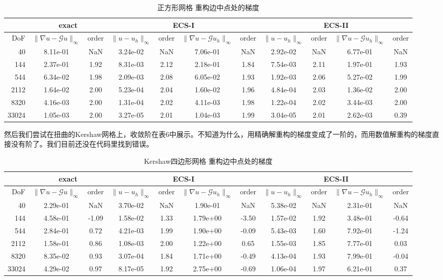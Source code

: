 \documentclass[12pt,a4paper]{article}
\theoremstyle{plain}
\begin{document}
\begin{table}[h]
\centering
\scriptsize
\begin{tabular}{r|cc|cc|cc|cc|cc}
\hline
& \multicolumn{2}{c|}{exact} & \multicolumn{4}{c}{ECS-I} & \multicolumn{4}{|c}{ECS-II} \\
\hline
DoF & $\|\nabla u - \mathcal{G} u\|_\infty$ & order & $\|u - u_h\|_\infty$ & order & $\|\nabla u - \mathcal{G} u_h\|_\infty$ & order & $\|u - u_h\|_\infty$ & order & $\|\nabla u - \mathcal{G} u_h\|_\infty$ & order \\
\hline
40 & 8.11e-01 & NaN & 3.24e-02 & NaN & 7.06e-01 & NaN & 2.92e-02 & NaN & 6.77e-01 & NaN \\
144 & 2.37e-01 & 1.92 & 8.31e-03 & 2.12 & 2.18e-01 & 1.84 & 7.54e-03 & 2.11 & 1.97e-01 & 1.93 \\
544 & 6.34e-02 & 1.98 & 2.09e-03 & 2.08 & 6.05e-02 & 1.93 & 1.92e-03 & 2.06 & 5.27e-02 & 1.99 \\
2112 & 1.64e-02 & 2.00 & 5.23e-04 & 2.04 & 1.60e-02 & 1.96 & 4.84e-04 & 2.03 & 1.36e-02 & 2.00 \\
8320 & 4.16e-03 & 2.00 & 1.31e-04 & 2.02 & 4.11e-03 & 1.98 & 1.22e-04 & 2.02 & 3.44e-03 & 2.00 \\
33024 & 1.05e-03 & 2.00 & 3.27e-05 & 2.01 & 1.04e-03 & 1.99 & 3.04e-05 & 2.01 & 2.62e-03 & 0.39 \\
\hline
\end{tabular}
\caption{正方形网格 重构边中点处的梯度}
\end{table}

然后我们尝试在扭曲的Kershaw网格上，收敛阶在表6中展示。不知道为什么，用精确解重构的梯度变成了一阶的，而用数值解重构的梯度直接没有阶了。我们目前还没在代码里找到错误。

\begin{table}[h]
\centering
\scriptsize
\begin{tabular}{r|cc|cc|cc|cc|cc}
\hline
& \multicolumn{2}{c|}{exact} & \multicolumn{4}{c}{ECS-I} & \multicolumn{4}{|c}{ECS-II} \\
\hline
DoF & $\|\nabla u - \mathcal{G} u\|_\infty$ & order & $\|u - u_h\|_\infty$ & order & $\|\nabla u - \mathcal{G} u_h\|_\infty$ & order & $\|u - u_h\|_\infty$ & order & $\|\nabla u - \mathcal{G} u_h\|_\infty$ & order \\
\hline
40 & 2.29e-01 & NaN & 3.70e-02 & NaN & 1.90e-01 & NaN & 5.38e-02 & NaN & 2.31e-01 & NaN \\
144 & 4.58e-01 & -1.09 & 1.58e-02 & 1.33 & 1.79e+00 & -3.50 & 1.57e-02 & 1.92 & 3.48e-01 & -0.64 \\
544 & 2.84e-01 & 0.72 & 4.21e-03 & 1.99 & 1.90e+00 & -0.09 & 5.43e-03 & 1.60 & 7.92e-01 & -1.24 \\
2112 & 1.58e-01 & 0.86 & 1.08e-03 & 2.00 & 1.22e+00 & 0.65 & 1.55e-03 & 1.85 & 7.77e-01 & 0.03 \\
8320 & 8.35e-02 & 0.93 & 3.07e-04 & 1.84 & 1.71e+00 & -0.49 & 4.13e-04 & 1.93 & 7.99e-01 & -0.04 \\
33024 & 4.29e-02 & 0.97 & 8.17e-05 & 1.92 & 2.75e+00 & -0.69 & 1.06e-04 & 1.97 & 6.21e-01 & 0.37 \\
\hline
\end{tabular}
\caption{Kershaw四边形网格 重构边中点处的梯度}
\end{table}
\end{document}
